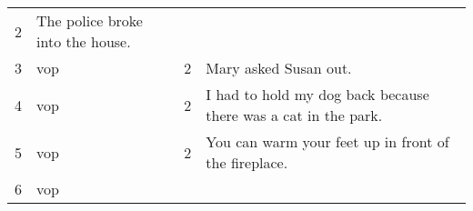\documentclass[12pt,spanish,a4paper,]{article}
\begin{document}
\begin{longtable}[]{@{}llll@{}}
\begin{minipage}[t]{0.09\columnwidth}
2\strut
\end{minipage} & \begin{minipage}[t]{0.63\columnwidth}\raggedright
The police broke into the house.\strut
\end{minipage}\tabularnewline
\begin{minipage}[t]{0.08\columnwidth}\raggedright
3\strut
\end{minipage} & \begin{minipage}[t]{0.09\columnwidth}\raggedright
vop\strut
\end{minipage} & \begin{minipage}[t]{0.09\columnwidth}\raggedright
2\strut
\end{minipage} & \begin{minipage}[t]{0.63\columnwidth}\raggedright
Mary asked Susan out.\strut
\end{minipage}\tabularnewline
\begin{minipage}[t]{0.08\columnwidth}\raggedright
4\strut
\end{minipage} & \begin{minipage}[t]{0.09\columnwidth}\raggedright
vop\strut
\end{minipage} & \begin{minipage}[t]{0.09\columnwidth}\raggedright
2\strut
\end{minipage} & \begin{minipage}[t]{0.63\columnwidth}\raggedright
I had to hold my dog back because there was a cat in the park.\strut
\end{minipage}\tabularnewline
\begin{minipage}[t]{0.08\columnwidth}\raggedright
5\strut
\end{minipage} & \begin{minipage}[t]{0.09\columnwidth}\raggedright
vop\strut
\end{minipage} & \begin{minipage}[t]{0.09\columnwidth}\raggedright
2\strut
\end{minipage} & \begin{minipage}[t]{0.63\columnwidth}\raggedright
You can warm your feet up in front of the fireplace.\strut
\end{minipage}\tabularnewline
\begin{minipage}[t]{0.08\columnwidth}\raggedright
6\strut
\end{minipage} & \begin{minipage}[t]{0.09\columnwidth}\raggedright
vop\strut
\end{minipage} & \begin{minipage}[t]{0.09\columnwidth}\raggedright

\end{minipage}
\end{longtable}
\end{document}
